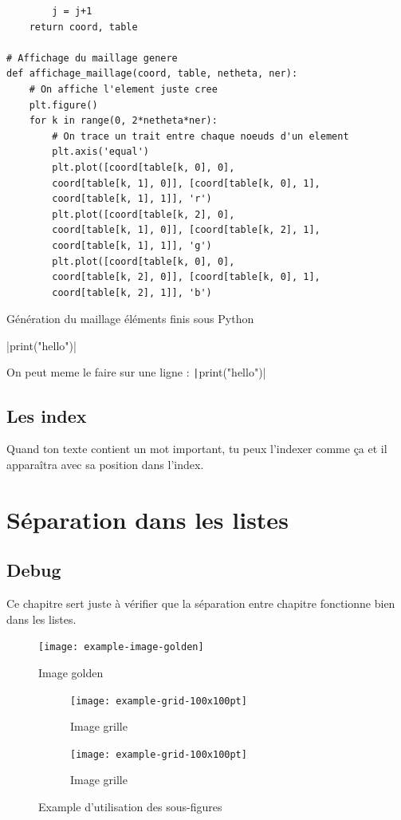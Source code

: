 \documentclass[a4paper,11pt]{report}    %
\newenvironment{longlisting}{\captionsetup{type=listing}}{} %
\begin{document}
\begin{longlisting}
\begin{verbatim}
        j = j+1
    return coord, table

# Affichage du maillage genere
def affichage_maillage(coord, table, netheta, ner):
    # On affiche l'element juste cree
    plt.figure()
    for k in range(0, 2*netheta*ner):
        # On trace un trait entre chaque noeuds d'un element
        plt.axis('equal')
        plt.plot([coord[table[k, 0], 0], 
        coord[table[k, 1], 0]], [coord[table[k, 0], 1], 
        coord[table[k, 1], 1]], 'r')
        plt.plot([coord[table[k, 2], 0], 
        coord[table[k, 1], 0]], [coord[table[k, 2], 1], 
        coord[table[k, 1], 1]], 'g')
        plt.plot([coord[table[k, 0], 0], 
        coord[table[k, 2], 0]], [coord[table[k, 0], 1], 
        coord[table[k, 2], 1]], 'b')
\end{verbatim}
\caption{Génération du maillage éléments finis sous Python}
\label{lst:PT_Mesh.py}
\end{longlisting}

|print("hello")| %

On peut meme le faire sur une ligne : \texttt|print("hello")|   %

\section{Les index}

Quand ton texte contient un mot important, tu peux l'indexer comme ça et il apparaîtra avec sa position dans l'index.

\chapter{Séparation dans les listes}

\section{Debug}

Ce chapitre sert juste à vérifier que la séparation entre chapitre fonctionne bien dans les listes.

\begin{figure}[H]
    \centering
    \texttt{[image: example-image-golden]}
    \caption{Image golden}
    \label{fig:example-image-golden}
\end{figure}

\begin{figure}[H]
    \begin{subfigure}[t]{0.475\textwidth}
        \texttt{[image: example-grid-100x100pt]}
        \caption{Image grille}
        \label{subfig:example-grid}
    \end{subfigure}%
    \hfill
    \begin{subfigure}[t]{0.475\textwidth}
        \texttt{[image: example-grid-100x100pt]}
        \caption{Image grille}
        \label{subfig:example-grid_bis}
    \end{subfigure}
    \caption{Example d'utilisation des sous-figures}
    \label{fig:test_subfigure_bis}
\end{figure}
\end{document}
